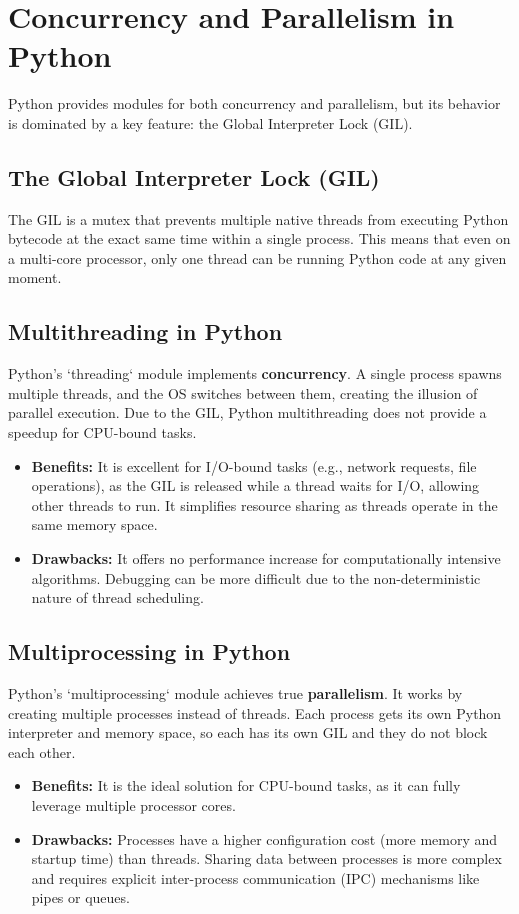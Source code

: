 \section{Concurrency and Parallelism in Python}
\label{sec:python_concurrency}
Python provides modules for both concurrency and parallelism, but its behavior is dominated by a key feature: the Global Interpreter Lock (GIL).

\subsection{The Global Interpreter Lock (GIL)}
The GIL is a mutex that prevents multiple native threads from executing Python bytecode at the exact same time within a single process. This means that even on a multi-core processor, only one thread can be running Python code at any given moment.

\subsection{Multithreading in Python}
Python's `threading` module implements \textbf{concurrency}. A single process spawns multiple threads, and the OS switches between them, creating the illusion of parallel execution. Due to the GIL, Python multithreading does not provide a speedup for CPU-bound tasks.
\begin{itemize}
    \item \textbf{Benefits:} It is excellent for I/O-bound tasks (e.g., network requests, file operations), as the GIL is released while a thread waits for I/O, allowing other threads to run. It simplifies resource sharing as threads operate in the same memory space.
    \item \textbf{Drawbacks:} It offers no performance increase for computationally intensive algorithms. Debugging can be more difficult due to the non-deterministic nature of thread scheduling.
\end{itemize}

\subsection{Multiprocessing in Python}
Python's `multiprocessing` module achieves true \textbf{parallelism}. It works by creating multiple processes instead of threads. Each process gets its own Python interpreter and memory space, so each has its own GIL and they do not block each other.
\begin{itemize}
    \item \textbf{Benefits:} It is the ideal solution for CPU-bound tasks, as it can fully leverage multiple processor cores.
    \item \textbf{Drawbacks:} Processes have a higher configuration cost (more memory and startup time) than threads. Sharing data between processes is more complex and requires explicit inter-process communication (IPC) mechanisms like pipes or queues.
\end{itemize}

